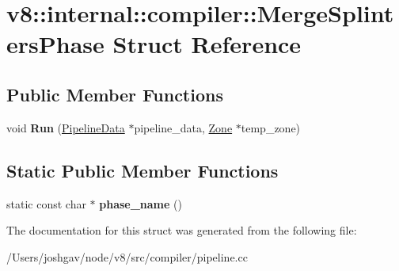 \hypertarget{structv8_1_1internal_1_1compiler_1_1_merge_splinters_phase}{}\section{v8\+:\+:internal\+:\+:compiler\+:\+:Merge\+Splinters\+Phase Struct Reference}
\label{structv8_1_1internal_1_1compiler_1_1_merge_splinters_phase}
\subsection*{Public Member Functions}
\begin{DoxyCompactItemize}
\item 
void {\bfseries Run} (\hyperlink{classv8_1_1internal_1_1compiler_1_1_pipeline_data}{Pipeline\+Data} $\ast$pipeline\+\_\+data, \hyperlink{classv8_1_1internal_1_1_zone}{Zone} $\ast$temp\+\_\+zone)\hypertarget{structv8_1_1internal_1_1compiler_1_1_merge_splinters_phase_a6b4dc9ed3507fb0e8a992c2e8ad382ca}{}\label{structv8_1_1internal_1_1compiler_1_1_merge_splinters_phase_a6b4dc9ed3507fb0e8a992c2e8ad382ca}

\end{DoxyCompactItemize}
\subsection*{Static Public Member Functions}
\begin{DoxyCompactItemize}
\item 
static const char $\ast$ {\bfseries phase\+\_\+name} ()\hypertarget{structv8_1_1internal_1_1compiler_1_1_merge_splinters_phase_a33f85cf690fb1735dc8caa2ad49dccd1}{}\label{structv8_1_1internal_1_1compiler_1_1_merge_splinters_phase_a33f85cf690fb1735dc8caa2ad49dccd1}

\end{DoxyCompactItemize}


The documentation for this struct was generated from the following file\+:\begin{DoxyCompactItemize}
\item 
/\+Users/joshgav/node/v8/src/compiler/pipeline.\+cc\end{DoxyCompactItemize}
